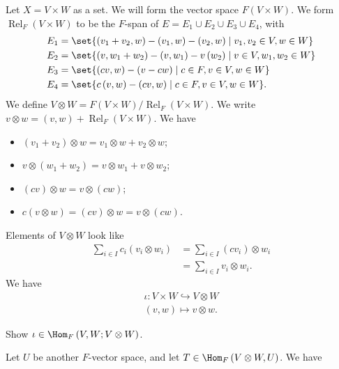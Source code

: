 \documentclass[10pt]{mypackage}
\begin{document}
  Let $X = V\times W$ as a set. We will form the vector space $F\left(V\times W\right)$. We form $\operatorname{Rel}_{F}\left(V\times W\right)$ to be the $F$-span of $E = E_1 \cup E_2 \cup E_3 \cup E_4$, with
  \begin{align*}
    E_1 &= \set{\left(v_1 + v_2,w\right) - \left(v_1,w\right) - \left(v_2,w\right)\mid v_1,v_2\in V,w\in W}\\
    E_2 &= \set{\left(v,w_1+w_2\right) - \left(v,w_1\right) - v\left(w_2\right)\mid v\in V,w_1,w_2\in W}\\
    E_3 &= \set{\left(cv,w\right) - \left(v-cw\right)\mid c\in F,v\in V,w\in W}\\
    E_4 &= \set{c\left(v,w\right)-\left(cv,w\right)\mid c\in F,v\in V,w\in W}.
  \end{align*}
  We define $V\otimes W = F\left(V\times W\right)/\operatorname{Rel}_{F}\left(V\times W\right)$. We write $v\otimes w = \left(v,w\right) + \operatorname{Rel}_{F}\left(V\times W\right)$. We have
  \begin{itemize}
    \item $\left(v_1 + v_2\right)\otimes w = v_1\otimes w + v_2\otimes w$;
    \item $v\otimes \left(w_1 + w_2\right) = v\otimes w_1 + v\otimes w_2$;
    \item $\left(cv\right)\otimes w = v\otimes \left(cw\right)$;
    \item $c\left(v\otimes w\right) = \left(cv\right)\otimes w = v\otimes \left(cw\right)$.
  \end{itemize}
  Elements of $V\otimes W$ look like
  \begin{align*}
    \sum_{i\in I}c_i\left(v_i\otimes w_i\right) &= \sum_{i\in I}\left(cv_i\right)\otimes w_i\\
                                                &= \sum_{i\in I}v_i\otimes w_i.
  \end{align*}
  We have
  \begin{align*}
    \iota: V\times W \hookrightarrow V\otimes W\\
    \left(v,w\right) \mapsto v\otimes w.
  \end{align*}
  \begin{exercise}
    Show $\iota\in \Hom_{F}\left(V,W;V\otimes W\right)$.
  \end{exercise}
  Let $U$ be another $F$-vector space, and let $T\in \Hom_{F}\left(V\otimes W,U\right)$. We have
\end{document}
